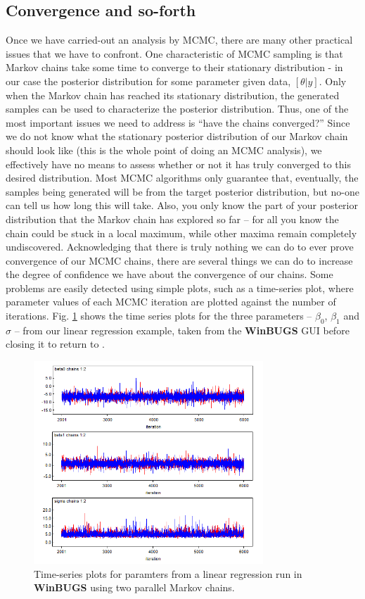 \subsection{Convergence and so-forth}
\label{glms.sec.convergence}

Once we have carried-out an analysis by MCMC, there are many other
practical issues that we have to confront. One characteristic of MCMC sampling is that Markov chains take some time to converge to their stationary distribution - in our case the posterior distribution for some parameter given  data, $[\theta|y]$. Only when the Markov chain has reached
its stationary distribution, the generated samples can be used to
characterize the posterior distribution. Thus, one of the most important issues we need to address 
is ``have the chains converged?'' Since we do not know what the
stationary posterior distribution of our Markov chain should look like
(this is the whole point of doing an MCMC analysis), we
effectively have no means to assess whether or not it has truly converged to
this desired distribution. Most MCMC algorithms only guarantee
that, eventually, the samples being generated will be from the target
posterior distribution, but no-one can tell us how long this will
take. Also, you only know the part of your posterior distribution that
the Markov chain has explored so far -- for all you know the chain
could be stuck in a local maximum, while other maxima remain
completely undiscovered.  Acknowledging that there is truly nothing we
can do to ever prove convergence of our MCMC chains, there are several
things we can do to increase the degree of confidence we have about
the convergence of our chains. Some problems are easily detected using
simple plots, such as a time-series plot, where parameter values of each MCMC iteration are plotted against the number of iterations.  Fig. \ref{glms.fig.linreg} shows the time series plots for the three parameters -- $\beta_0$, $\beta_1$ and $\sigma$ -- from our linear regression example, taken from the {\bf WinBUGS} GUI before closing it to return to {\R}. 

\begin{figure}[ht]
\begin{center}
\includegraphics[height=3in]{Ch3-Bayes/figs/BUGSchains}
\end{center}
\caption{
Time-series plots for paramters from a linear regression run in {\bf WinBUGS} using two parallel Markov chains.}
\label{glms.fig.linreg}
\end{figure}

